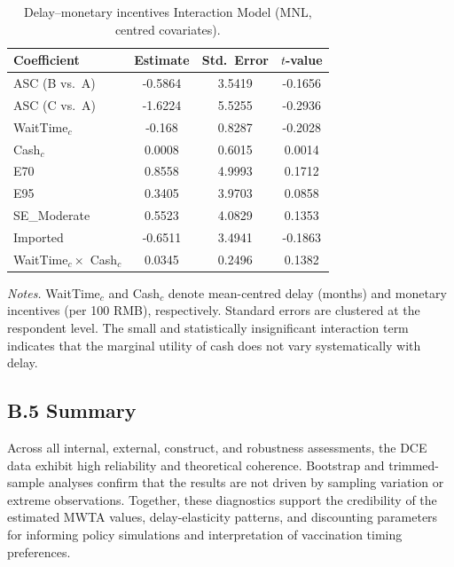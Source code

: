 \documentclass[12pt]{article}
\begin{document}
\begin{table}[H]
\centering
\caption{Delay--monetary incentives Interaction Model (MNL, centred covariates).}
\label{tab:delay_cash_interaction}
\begin{tabular}{lccc}
\toprule
\textbf{Coefficient} & \textbf{Estimate} & \textbf{Std.\ Error} & \textbf{$t$-value} \\
\midrule
ASC (B vs.\ A)        & -0.5864 & 3.5419 & -0.1656 \\
ASC (C vs.\ A)        & -1.6224 & 5.5255 & -0.2936 \\
WaitTime$_c$          & -0.168 & 0.8287 & -0.2028 \\
Cash$_c$              &  0.0008 & 0.6015 &  0.0014 \\
E70                   &  0.8558 & 4.9993 &  0.1712 \\
E95                   &  0.3405 & 3.9703 &  0.0858 \\
SE\_Moderate          &  0.5523 & 4.0829 &  0.1353 \\
Imported              & -0.6511 & 3.4941 & -0.1863 \\
WaitTime$_c \times$ Cash$_c$ 
                      &  0.0345 & 0.2496 &  0.1382 \\
\bottomrule
\end{tabular}
\begin{flushleft}
\footnotesize
\textit{Notes.} WaitTime$_c$ and Cash$_c$ denote mean-centred delay (months) and monetary incentives 
(per 100 RMB), respectively. Standard errors are clustered at the respondent level. The small 
and statistically insignificant interaction term indicates that the marginal utility of cash 
does not vary systematically with delay.
\end{flushleft}
\end{table}





\subsection*{B.5 Summary}

Across all internal, external, construct, and robustness assessments, the DCE data exhibit
high reliability and theoretical coherence. Bootstrap and trimmed-sample analyses confirm
that the results are not driven by sampling variation or extreme observations. Together, these
diagnostics support the credibility of the estimated MWTA values, delay-elasticity patterns,
and discounting parameters for informing policy simulations and interpretation of vaccination
timing preferences.
\end{document}
